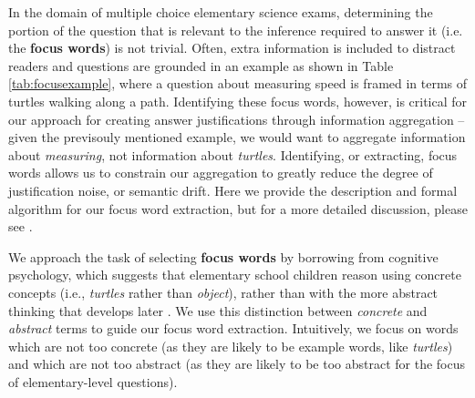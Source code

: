 In the domain of multiple choice elementary science exams, determining the portion of the question that is relevant to the inference required to answer it (i.e. the \textbf{focus words}) is not trivial.  Often, extra information is included to distract readers and questions are grounded in an example as shown in Table \ref{tab:focusexample}, where a question about measuring speed is framed in terms of turtles walking along a path.  Identifying these focus words, however, is critical for our approach for creating answer justifications through information aggregation -- given the previsouly mentioned example, we would want to aggregate information about \textit{measuring}, not information about \textit{turtles}.  Identifying, or extracting, focus words allows us to constrain our aggregation to greatly reduce the degree of justification noise, or semantic drift. 
Here we provide the description and formal algorithm for our focus word extraction, but for a more detailed discussion, please see \citet{jansen2017framing}.


We approach the task of selecting \textbf{focus words} by borrowing from cognitive psychology, which suggests that elementary school children reason using concrete concepts (i.e., \textit{turtles} rather than \textit{object}), rather than with the more abstract thinking that develops later \citep{Piaget1954}.  We use this distinction between \textit{concrete} and \textit{abstract} terms to guide our focus word extraction.  Intuitively, we focus on words which are not too concrete (as they are likely to be example words, like \textit{turtles}) and which are not too abstract (as they are likely to be too abstract for the focus of elementary-level questions).  

